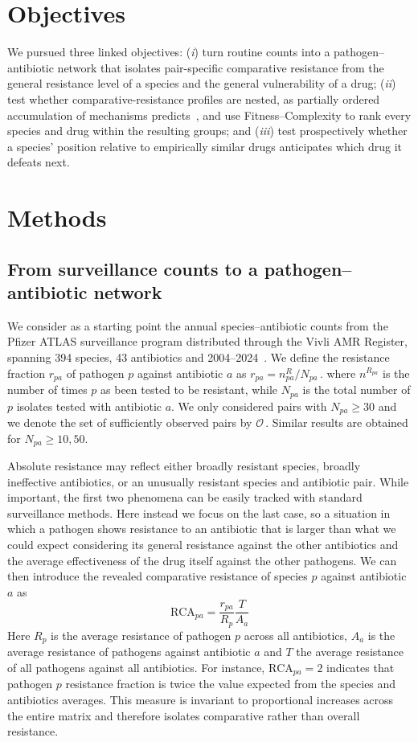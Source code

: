 \documentclass[10pt]{article}
\newcommand{\rca}{\mathrm{RCA}}
\begin{document}
\section*{Objectives}
We pursued three linked objectives: (\emph{i}) turn routine counts into a pathogen--antibiotic network that isolates pair-specific comparative resistance from the general resistance level of a species and the general vulnerability of a drug; (\emph{ii}) test whether comparative-resistance profiles are nested, as partially ordered accumulation of mechanisms predicts~\cite{toprak2012,barbosa2017}, and use Fitness--Complexity to rank every species and drug within the resulting groups; and (\emph{iii}) test prospectively whether a species' position relative to empirically similar drugs anticipates which drug it defeats next.

\section*{Methods}
\subsection*{From surveillance counts to a pathogen--antibiotic network}
We consider as a starting point the annual species--antibiotic counts from the Pfizer ATLAS surveillance program distributed through the Vivli AMR Register, spanning 394 species, 43 antibiotics and 2004--2024~\cite{atlas}. We define the resistance fraction $r_{pa}$ of pathogen $p$ against antibiotic $a$ as
\(
 r_{pa}=n^R_{pa}/N_{pa}\,.
\)
where $n^{R_{pa}}$ is the number of times $p$ as been tested to be resistant, while $N_{pa}$ is the total number of $p$ isolates tested with antibiotic $a$. We only considered pairs with $N_{pa}\geq30$ and we denote the set of sufficiently observed pairs by \(\mathcal O\,\). Similar results are obtained for $N_{pa}\geq10, 50$. 
 
Absolute resistance may reflect either broadly resistant species, broadly ineffective antibiotics, or an unusually resistant species and antibiotic pair. While important, the first two phenomena can be easily tracked with standard surveillance methods. Here instead we focus on the last case, so a situation in which a pathogen shows resistance to an antibiotic that is larger than what we could expect considering its general resistance against the other antibiotics and the average effectiveness of the drug itself against the other pathogens. We can then introduce the revealed comparative resistance of species \(p\) against antibiotic \(a\) as
\[
 \rca_{pa}=\frac{r_{pa}}{R_p}\frac{T}{A_a}
\]
Here $R_p$ is the average resistance of pathogen $p$ across all antibiotics, $A_a$ is the average resistance of pathogens against antibiotic $a$ and $T$ the average resistance of all pathogens against all antibiotics. For instance, $\rca_{pa}=2$ indicates that pathogen $p$ resistance fraction is twice the value expected from the species and antibiotics averages. This measure is invariant to proportional increases across the entire matrix and therefore isolates comparative rather than overall resistance.
\end{document}
